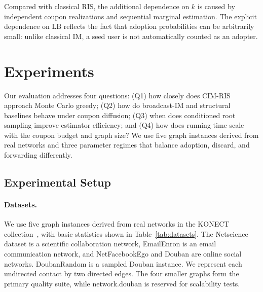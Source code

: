 \documentclass[sigconf,balance=false]{acmart}
\newcommand{\CIMRIS}{\textsc{CIM-RIS}}
\begin{document}
Compared with classical RIS, the additional dependence on $k$ is caused
by independent coupon realizations and sequential marginal estimation.
The explicit dependence on $\mathrm{LB}$ reflects the fact that adoption
probabilities can be arbitrarily small: unlike classical IM, a seed user is
not automatically counted as an adopter.

\section{Experiments}
\label{sec:exp}

Our evaluation addresses four questions:
(Q1) how closely does \CIMRIS{} approach Monte Carlo greedy;
(Q2) how do broadcast-IM and structural baselines behave under coupon
diffusion; (Q3) when does conditioned root sampling improve estimator
efficiency; and (Q4) how does running time scale with the coupon budget
and graph size?
We use five graph instances derived from real networks and three parameter
regimes that balance adoption, discard, and forwarding differently.

\subsection{Experimental Setup}
\label{sec:exp-setup}

\paragraph{Datasets.}
We use five graph instances derived from real networks in the KONECT
collection~\cite{kunegis2013konect}, with basic statistics shown in
Table~\ref{tab:datasets}.
The Netscience dataset is a scientific collaboration network, EmailEnron
is an email communication network, and NetFacebookEgo and Douban are
online social networks. DoubanRandom is a sampled Douban instance.
We represent each undirected contact by two directed edges.
The four smaller graphs form the primary quality suite, while
network.douban is reserved for scalability tests.
\end{document}
